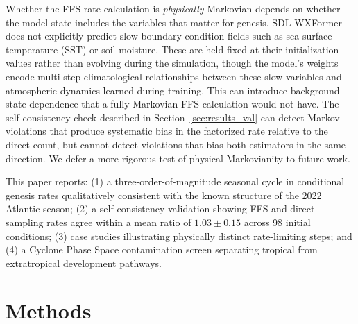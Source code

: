 \documentclass[11pt]{article}
\begin{document}
Whether the FFS rate calculation is \textit{physically} Markovian depends on whether
the model state includes the variables that matter for genesis.
SDL-WXFormer does not explicitly predict slow boundary-condition fields such as
sea-surface temperature (SST) or soil moisture. These are held fixed at their initialization values rather than evolving during the simulation, though the model's weights encode multi-step climatological relationships between these slow variables and atmospheric dynamics learned during training. This can introduce background-state dependence that a fully Markovian FFS calculation
would not have. The self-consistency check described in Section~\ref{sec:results_val} can detect Markov violations that produce systematic bias in the factorized rate relative to the direct count, but cannot detect violations that bias both estimators in the same direction. We defer a more rigorous test of physical Markovianity to future work.

This paper reports: (1) a three-order-of-magnitude seasonal cycle in conditional genesis
rates qualitatively consistent with the known structure of the 2022 Atlantic season; (2) a self-consistency validation showing FFS and direct-sampling rates agree within a mean ratio of $1.03\pm0.15$ across 98 initial conditions; (3) case studies illustrating physically distinct rate-limiting steps; and (4) a Cyclone Phase Space \citep[CPS;][]{hart2003cyclone} contamination screen separating tropical from extratropical development pathways.

\section{Methods}
\end{document}
